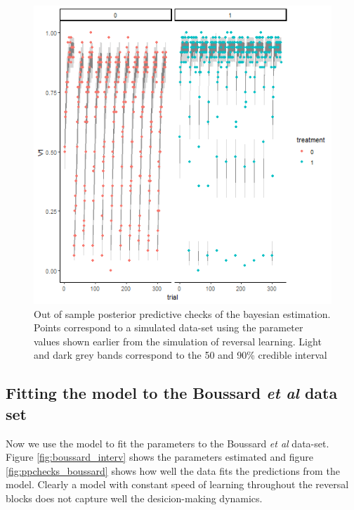 \documentclass[
]{article}
\begin{document}
\begin{figure}

\includegraphics{reversal_ppchecks} \hfill{}

\caption{Out of sample posterior predictive checks of the bayesian estimation. Points correspond to a simulated data-set using the parameter values shown earlier from the simulation of reversal learning. Light and dark grey bands correspond to the 50 and 90\% credible interval}\label{fig:ppcheck_rev}
\end{figure}

\hypertarget{fitting-the-model-to-the-boussard-et-al-data-set}{%
\subsection{\texorpdfstring{Fitting the model to the Boussard \emph{et
al} data
set}{Fitting the model to the Boussard et al data set}}\label{fitting-the-model-to-the-boussard-et-al-data-set}}

Now we use the model to fit the parameters to the Boussard \emph{et al}
data-set. Figure \ref{fig:boussard_interv} shows the parameters
estimated and figure \ref{fig:ppchecks_boussard} shows how well the data
fits the predictions from the model. Clearly a model with constant speed
of learning throughout the reversal blocks does not capture well the
desicion-making dynamics.
\end{document}
